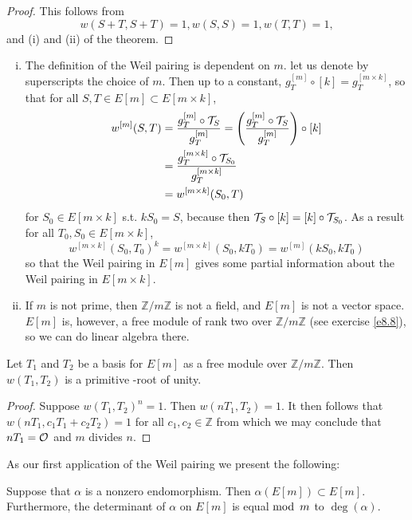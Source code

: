 \begin{proof}
This follows from
$$
w(S+T,S+T)=1,w(S,S)=1,w(T,T)=1,
$$
and (i) and (ii) of the theorem.
\end{proof}

\rem

\begin{enumerate}[(i)]
\item
The definition of the Weil pairing is dependent on $m$. let us denote by superscripts the choice of $m$. Then up to a constant, $g_T^{[m]} \circ[k] = g_T^{[m\times k]}$, so that for all $S,T \in E[m]\subset E[m\times k]$,
\begin{align*}
w^{[m]}(S,T)&=\frac{g_T^{[m]}\circ \mathcal{T}_{S}}{g_T^{[m]}} =\left(\frac{g_T^{[m]}\circ \mathcal{T}_{S}}{g_T^{[m]}}\right) \circ [k]\\
&=\frac{g_T^{[m\times k]}\circ \mathcal{T}_{S_0}}{g_T^{[m\times k]}}\\
&=w^{[m\times k]}(S_0,T)
\end{align*}
for $S_0 \in E[m\times k]$ s.t. $k S_0 = S$, because then $\mathcal{T}_{S}\circ [k] = [k] \circ \mathcal{T}_{S_0}$.
As a result for all $T_0, S_0 \in E[m \times k]$, 
\[w^{[m\times k]}(S_0,T_0)^k = w^{[m\times k]}(S_0,k T_0) = w^{[m]}(k S_0, k T_0)\]
so that the Weil pairing in $E[m]$ gives some partial information about the Weil pairing in $E[m\times k]$.
\item
If $m$ is not prime, then $\mathbb{Z}/m\mathbb{Z}$ is not a field, and $E[m]$ is not a vector space. $E[m]$ is, however, a free module of rank two over $\mathbb{Z}/m\mathbb{Z}$ (see exercise \ref{e8.8}), so we can do linear algebra there.
\end{enumerate}

\begin{coro}
\label{c13.9}
Let $T_{1}$ and $T_{2}$ be a basis for $E[m]$ as a free module over $\mathbb{Z}/m\mathbb{Z}$. Then $w(T_{1},T_{2})$ is a primitive -root of unity.
\end{coro}

\begin{proof}
Suppose $w(T_{1},T_{2})^{n}=1$. Then $w(nT_{1},T_{2})=1$. It then follows that $w(nT_{1},c_{1}T_{1}+c_{2}T_{2})=1$ for all $c_{1},c_{2}\in \mathbb{Z}$ from which we may conclude that $nT_{1}=\mathcal{O}$ and $m$ divides $n$.
\end{proof}

As our first application of the Weil pairing we present the following:

\begin{theo}
\label{t13.10}
Suppose that $\alpha$ is a nonzero endomorphism. Then $\alpha(E[m]) \subset E[m]$. Furthermore, the determinant of $\alpha$  on $E[m]$ is equal $\operatorname{mod}\ m$ to $\deg(\alpha)$.
\end{theo}

